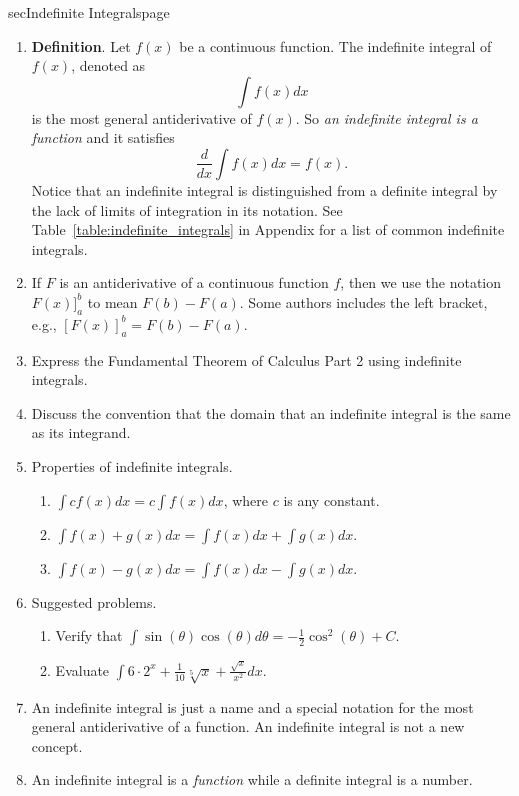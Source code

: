 \documentclass[../main]{subfiles}
\begin{document}
%
%
\begin{outline}{sec}{Indefinite Integrals}{page} \label{outline:indefinite_integrals}
  \begin{enumerate}
    \item \textbf{Definition}. Let \(f(x)\) be a continuous function. The indefinite integral of \(f(x)\), denoted as
      \[
        \int f(x) dx
      \]
      is the most general antiderivative of \(f(x)\). So \emph{an indefinite integral is a function} and it satisfies
      \[
        \frac{d}{dx} \int f(x) dx = f(x).
      \]
      Notice that an indefinite integral is distinguished from a definite integral by the lack of limits of integration in its notation. 
      See Table~\ref{table:indefinite_integrals} in Appendix for a list of common indefinite integrals.
      
    \item If \(F\) is an antiderivative of a continuous function \(f\), then we use the notation \(F(x) ]^{b}_{a}\) to mean \(F(b) - F(a)\). Some authors includes the left bracket, e.g., \([ F(x) ]^{b}_{a} = F(b) - F(a)\).
    \item Express the Fundamental Theorem of Calculus Part 2 using indefinite integrals.
    \item Discuss the convention that the domain that an indefinite integral is the same as its integrand.
    \item Properties of indefinite integrals. 
      \begin{enumerate}[label=(\alph*)]
      \item \(\int c f(x) dx = c \int f(x) dx\), where \(c\) is any constant.
      \item \(\int f(x) + g(x) dx = \int f(x) dx + \int g(x) dx\).
      \item \(\int f(x) - g(x) dx = \int f(x) dx - \int g(x) dx\).
      \end{enumerate}

    \item Suggested problems.
      \begin{enumerate}
      \item Verify that \(\int \sin(\theta) \cos(\theta) d \theta = - \frac{1}{2} \cos^{2}(\theta) + C\).
      \item Evaluate \(\int 6 \cdot 2^{x} + \frac{1}{10} \sqrt[5]{x} + \frac{\sqrt{x}}{x^{2}} dx\).
      \end{enumerate}
      
    \item {An indefinite integral is just a name and a special notation for the most general antiderivative of a function. An indefinite integral is not a new concept.}
    \item {An indefinite integral is a \emph{function} while a definite integral is a number.}
\end{enumerate}
\end{outline}
\end{document}
